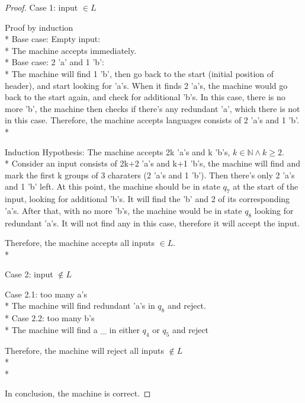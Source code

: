 \documentclass{article}
\begin{document}
\begin{multicols}{2}

    \begin{proof}
        Case 1: input $\in L$
        \begin{addmargin}[1em]{0em}
            Proof by induction\\*
            Base case: Empty input:\\*
            The machine accepts immediately.\\*
            Base case: 2 'a' and 1 'b':\\*
            The machine will find 1 'b', then go back to the start (initial position of header),
            and start looking for 'a's. When it finds 2 'a's, the machine would go back to
            the start again, and check for additional 'b's. In this case, there is no more 'b',
            the machine then checks if there's any redundant 'a', which there is not in this case.
            Therefore, the machine accepts languages consists of 2 'a's and 1 'b'.\\*

            Induction Hypothesis: The machine accepts 2k 'a's and k 'b's, $k\in \mathbb{N} \land
                k \geq 2$.\\*
            Consider an input consists of 2k+2 'a's and k+1 'b's, the machine will find and mark the
            first k groups of 3 charaters (2 'a's and 1 'b'). Then there's only 2 'a's and 1 'b' left.
            At this point, the machine should be in state $q_7$ at the start of the input, looking for additional 'b's. It will
            find the 'b' and 2 of its corresponding 'a's. After that, with no more 'b's,
            the machine would be in state $q_8$ looking for redundant 'a's. It will not find
            any in this case, therefore it will accept the input.

            Therefore, the machine accepts all inputs $\in L$.\\*
        \end{addmargin}
        Case 2: input $\notin L$
        \begin{addmargin}[1em]{0em}
            Case 2.1: too many a's\\*
            The machine will find redundant 'a's in $q_8$ and reject.\\*
            Case 2.2: too many b's\\*
            The machine will find a \_ in either $q_4$ or $q_5$ and reject
        \end{addmargin}
        Therefore, the machine will reject all inputs $\notin L$\\*\\*

        In conclusion, the machine is correct.
    \end{proof}
\end{multicols}
\end{document}

